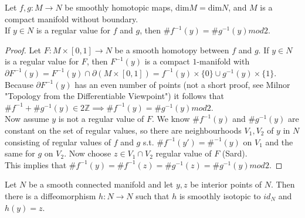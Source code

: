 \begin{lemma}\label{8.3}
    Let $f,g:M\to N$ be smoothly homotopic maps, dim$M=$dim$N$, and $M$ is a compact manifold without boundary.\\
    If $y\in N$ is a regular value for $f$ and $g$, then $\#f^{-1}(y)=\#g^{-1}(y) mod 2$.
\end{lemma}
\begin{proof}
    Let $F:M\times[0,1]\to N$ be a smooth homotopy between $f$ and $g$. If $y\in N$ is a regular value for $F$, then $F^{-1}(y)$ is a compact $1$-manifold with $\partial F^{-1}(y)=F^{-1}(y)\cap\partial(M\times[0,1])=f^{-1}(y)\times\{0\}\cup g^{-1}(y)\times\{1\}$.\\
    Because $\partial F^{-1}(y)$ has an even number of points (not a short proof, see Milnor "Topology from the Differentiable Viewpoint") it follows that $\#f^{-1}+\#g^{-1}(y)\in 2\mathbb{Z}\implies \#f^{-1}(y)=\#g^{-1}(y) mod 2$.\\
    Now assume $y$ is not a regular value of $F$. We know $\#f^{-1}(y)$ and $\#g^{-1}(y)$ are constant on the set of regular values, so there are neighbourhoods $V_1,V_2$ of $y$ in $N$ consisting of regular values of $f$ and $g$ s.t. $\# f^{-1}(y')=\#^{-1}(y)$ on $V_1$ and the same for $g$ on $V_2$. Now choose $z\in V_1\cap V_2$ regular value of $F$ (Sard).\\
    This implies that $\#f^{-1}(y)=\#f^{-1}(z)=\#g^{-1}(z)=\#g^{-1}(y) mod 2$.
\end{proof}
\begin{lemma}\label{8.4}
    Let $N$ be a smooth connected manifold and let $y,z$ be interior points of $N$. Then there is a diffeomorphism $h:N\to N$ such that $h$ is smoothly isotopic to $id_N$ and $h(y)=z$.
\end{lemma}
